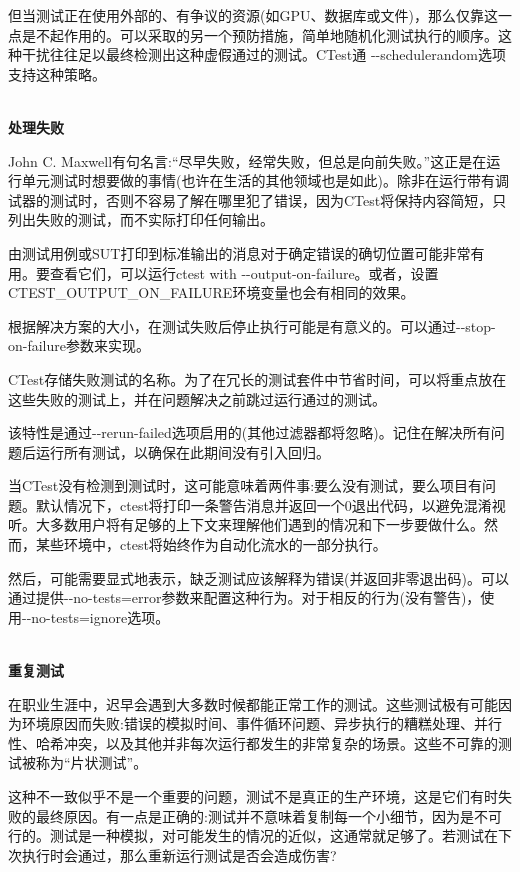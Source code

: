 但当测试正在使用外部的、有争议的资源(如GPU、数据库或文件)，那么仅靠这一点是不起作用的。可以采取的另一个预防措施，简单地随机化测试执行的顺序。这种干扰往往足以最终检测出这种虚假通过的测试。CTest通 -{}-schedulerandom选项支持这种策略。

\hspace*{\fill} \\ %
\noindent
\textbf{处理失败}

John C. Maxwell有句名言:“尽早失败，经常失败，但总是向前失败。”这正是在运行单元测试时想要做的事情(也许在生活的其他领域也是如此)。除非在运行带有调试器的测试时，否则不容易了解在哪里犯了错误，因为CTest将保持内容简短，只列出失败的测试，而不实际打印任何输出。

由测试用例或SUT打印到标准输出的消息对于确定错误的确切位置可能非常有用。要查看它们，可以运行ctest with -{}-output-on-failure。或者，设置CTEST\_OUTPUT\_ON\_FAILURE环境变量也会有相同的效果。

根据解决方案的大小，在测试失败后停止执行可能是有意义的。可以通过-{}-stop-on-failure参数来实现。

CTest存储失败测试的名称。为了在冗长的测试套件中节省时间，可以将重点放在这些失败的测试上，并在问题解决之前跳过运行通过的测试。

该特性是通过-{}-rerun-failed选项启用的(其他过滤器都将忽略)。记住在解决所有问题后运行所有测试，以确保在此期间没有引入回归。

当CTest没有检测到测试时，这可能意味着两件事:要么没有测试，要么项目有问题。默认情况下，ctest将打印一条警告消息并返回一个0退出代码，以避免混淆视听。大多数用户将有足够的上下文来理解他们遇到的情况和下一步要做什么。然而，某些环境中，ctest将始终作为自动化流水的一部分执行。

然后，可能需要显式地表示，缺乏测试应该解释为错误(并返回非零退出码)。可以通过提供-{}-no-tests=error参数来配置这种行为。对于相反的行为(没有警告)，使用-{}-no-tests=ignore选项。

\hspace*{\fill} \\ %
\noindent
\textbf{重复测试}

在职业生涯中，迟早会遇到大多数时候都能正常工作的测试。这些测试极有可能因为环境原因而失败:错误的模拟时间、事件循环问题、异步执行的糟糕处理、并行性、哈希冲突，以及其他并非每次运行都发生的非常复杂的场景。这些不可靠的测试被称为“片状测试”。

这种不一致似乎不是一个重要的问题，测试不是真正的生产环境，这是它们有时失败的最终原因。有一点是正确的:测试并不意味着复制每一个小细节，因为是不可行的。测试是一种模拟，对可能发生的情况的近似，这通常就足够了。若测试在下次执行时会通过，那么重新运行测试是否会造成伤害?

